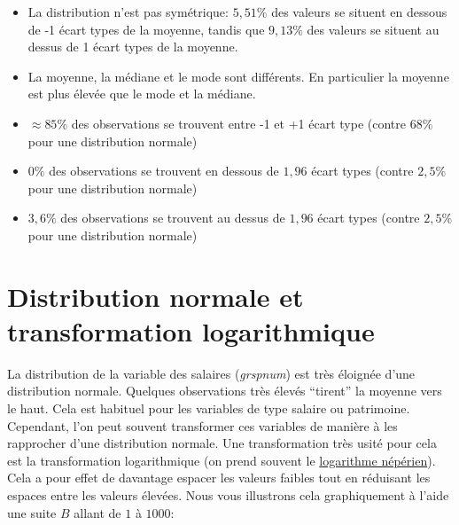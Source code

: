 \documentclass[
]{book}
\providecommand{\tightlist}{%
  \setlength{\itemsep}{0pt}\setlength{\parskip}{0pt}}
\begin{document}
\begin{itemize}
\tightlist
\item
  La distribution n'est pas symétrique: \(5,51\%\) des valeurs se situent en dessous de -1 écart types de la moyenne, tandis que \(9,13\%\) des valeurs se situent au dessus de 1 écart types de la moyenne.
\item
  La moyenne, la médiane et le mode sont différents. En particulier la moyenne est plus élevée que le mode et la médiane.
\item
  \(\approx85\%\) des observations se trouvent entre -1 et +1 écart type (contre \(68\%\) pour une distribution normale)
\item
  \(0\%\) des observations se trouvent en dessous de \(1,96\) écart types (contre \(2,5\%\) pour une distribution normale)
\item
  \(3,6\%\) des observations se trouvent au dessus de \(1,96\) écart types (contre \(2,5\%\) pour une distribution normale)
\end{itemize}

\hypertarget{trans_log_grspnum}{%
\section{Distribution normale et transformation logarithmique}\label{trans_log_grspnum}}

La distribution de la variable des salaires (\emph{grspnum}) est très éloignée d'une distribution normale. Quelques observations très élevés ``tirent'' la moyenne vers le haut. Cela est habituel pour les variables de type salaire ou patrimoine. Cependant, l'on peut souvent transformer ces variables de manière à les rapprocher d'une distribution normale. Une transformation très usité pour cela est la transformation logarithmique (on prend souvent le \href{https://fr.wikipedia.org/wiki/Logarithme_naturel}{logarithme népérien}). Cela a pour effet de davantage espacer les valeurs faibles tout en réduisant les espaces entre les valeurs élevées. Nous vous illustrons cela graphiquement à l'aide une suite \(B\) allant de \(1\) à \(1000\):
\end{document}
